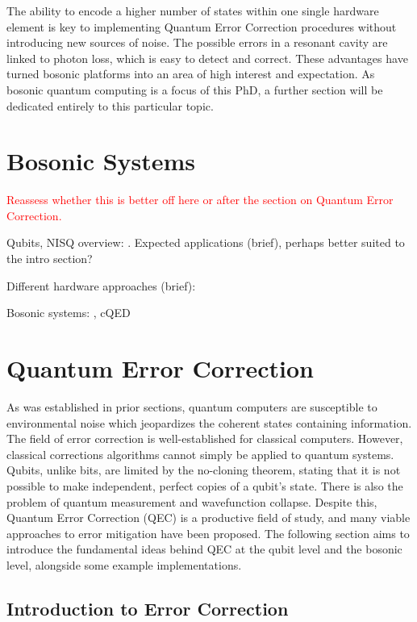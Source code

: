 The ability to encode a higher number of states within one single hardware element is key to implementing Quantum Error Correction procedures without introducing new sources of noise. The possible errors in a resonant cavity are linked to photon loss, which is easy to detect and correct. These advantages have turned bosonic platforms into an area of high interest and expectation. As bosonic quantum computing is a focus of this PhD, a further section will be dedicated entirely to this particular topic.


\section{Bosonic Systems}
\textcolor{red}{Reassess whether this is better off here or after the section on Quantum Error Correction.}

\vspace{5cm}
Qubits, NISQ overview: \cite{Nielsen2010} \cite{Preskill2018} \cite{IBMintro} \cite{Kaye2007} \cite{Cleve2021}. 
Expected applications (brief), perhaps better suited to the intro section?

Different hardware approaches (brief): \cite{Dwave} \cite{Zurich} \cite{IBMtec}

Bosonic systems: \cite{Zurich} \cite{Girvin2021}, cQED

\clearpage
\section{Quantum Error Correction}

As was established in prior sections, quantum computers are susceptible to environmental noise which jeopardizes the coherent states containing information. The field of error correction is well-established for classical computers. However, classical corrections algorithms cannot simply be applied to quantum systems. Qubits, unlike bits, are limited by the no-cloning theorem, stating that it is not possible to make independent, perfect copies of a qubit's state. There is also the problem of quantum measurement and wavefunction collapse. Despite this, Quantum Error Correction (QEC) is a productive field of study, and many viable approaches to error mitigation have been proposed. The following section aims to introduce the fundamental ideas behind QEC at the qubit level and the bosonic level, alongside some example implementations.

\subsection{Introduction to Error Correction}

